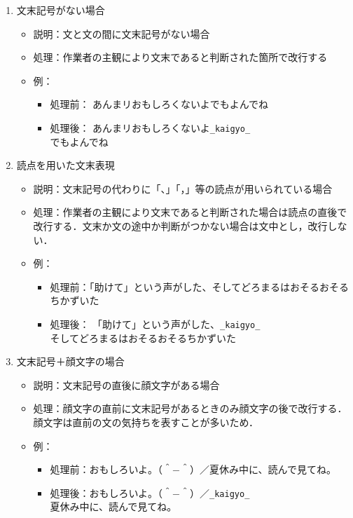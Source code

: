 \documentclass[japanese]{jnlp_1.4}
\begin{document}
\begin{enumerate}
\item 文末記号がない場合\label{subsubsec:3-6-1}
 \begin{itemize}
 \item[] 
	 説明：文と文の間に文末記号がない場合
 \item[] 
	 処理：作業者の主観により文末であると判断された箇所で改行する
 \item[] 
	 例：
	 \begin{itemize}
	  \item[] 
		  処理前：
		  あんまリおもしろくないよでもよんでね
	  \item[]
		  処理後：
		  あんまリおもしろくないよ{\tt \_kaigyo\_}\\
		  でもよんでね
	 \end{itemize}
 \end{itemize}
\item 読点を用いた文末表現\label{subsubsec:3-6-2}
 \begin{itemize}
 \item[] 
	 説明：文末記号の代わりに「、」「，」等の読点が用いられている場合
 \item[] 
	 処理：作業者の主観により文末であると判断された場合は読点の直後で改行する．文末か文の途中か判断がつかない場合は文中とし，改行しない．
 \item[] 
	 例：
	 \begin{itemize}
	  \item[] 
		  処理前：「助けて」という声がした、そしてどろまるはおそるおそるちかずいた
	  \item[] 
		  処理後：
		  「助けて」という声がした、{\tt \_kaigyo\_}\\
		  そしてどろまるはおそるおそるちかずいた
	 \end{itemize}
 \end{itemize}


 \item 文末記号＋顔文字の場合\label{subsubsec:3-3-2}
 \begin{itemize}
 \item[]
	説明：文末記号の直後に顔文字がある場合
 \item[] 
	処理：顔文字の直前に文末記号があるときのみ顔文字の後で改行する．顔文字は直前の文の気持ちを表すことが多いため．
 \item[] 
	例：
	\begin{itemize}
	 \item[] 
		 処理前：おもしろいよ。（＾−＾）／夏休み中に、読んで見てね。
	 \item[] 
		 処理後：おもしろいよ。（＾−＾）／{\tt \_kaigyo\_}\\
		 夏休み中に、読んで見てね。
	\end{itemize}
 \end{itemize}



\end{enumerate}
\end{document}
